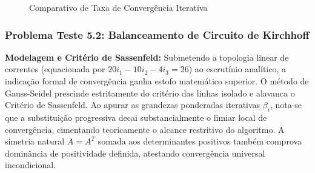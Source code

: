 \begin{figure}[H]
\centering
{}
\caption{Comparativo de Taxa de Convergência Iterativa}
\label{fig:seidel_comparativo}
\end{figure}

\subsubsection{Problema Teste 5.2: Balanceamento de Circuito de Kirchhoff}

\textbf{Modelagem e Critério de Sassenfeld:} Submetendo a topologia linear de correntes (equacionada por $20i_1-10i_2-4i_3 = 26$) ao escrutínio analítico, a indicação formal de convergência ganha estofo matemático superior. O método de Gauss-Seidel prescinde estritamente do critério das linhas isolado e alavanca o Critério de Sassenfeld. Ao apurar as grandezas ponderadas iterativas $\beta_i$, nota-se que a substituição progressiva decai substancialmente o limiar local de convergência, cimentando teoricamente o alcance restritivo do algoritmo. A simetria natural $A = A^T$ somada aos determinantes positivos também comprova dominância de positividade definida, atestando convergência universal incondicional.

\begin{table}[H]
\centering
\caption{Registros Críticos do Método de Gauss-Seidel (Problema 5.2)}
\label{tab:seidel_prob52}
\end{table}


